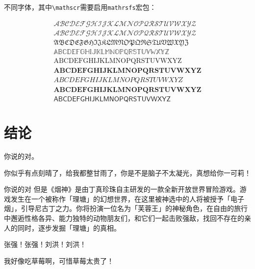 不同字体，其中\verb|\mathscr|需要启用\verb|mathrsfs|宏包：

\begin{equation}
\label{hello}
    \begin{array}{c}
        \mathscr{ABCDEFGHIJKLMNOPQRSTUVWXYZ} \\
        \mathcal{ABCDEFGHIJKLMNOPQRSTUVWXYZ} \\
        \mathfrak{ABCDEFGHIJKLMNOPQRSTUVWXYZ} \\
        \mathbb{ABCDEFGHIJKLMNOPQRSTUVWXYZ} \\
        \mathrm{ABCDEFGHIJKLMNOPQRSTUVWXYZ} \\
        \mathbf{ABCDEFGHIJKLMNOPQRSTUVWXYZ} \\
        ABCDEFGHIJKLMNOPQRSTUVWXYZ \\
        \boldsymbol{ABCDEFGHIJKLMNOPQRSTUVWXYZ} \\
        \mathsf{ABCDEFGHIJKLMNOPQRSTUVWXYZ}
    \end{array}
\end{equation}




\chapter*{结\quad 论}

你说的对。

你似乎有点刻晴了，给我都整甘雨了，你是不是脑子不太凝光，真想给你一可莉！

你说的对 但是《烟神》是由丁真珍珠自主研发的一款全新开放世界冒险游戏。游戏发生在一个被称作「理塘」的幻想世界，在这里被神选中的人将被授予「电子烟」，引导尼古丁之力。你将扮演一位名为「芙蓉王」的神秘角色，在自由的旅行中邂逅性格各异、能力独特的动物朋友们，和它们一起击败强敌，找回不存在的亲人的同时，逐步发掘「理塘」的真相。

张强！张强！刘洪！刘洪！

我好像吃草莓啊，可惜草莓太贵了！

